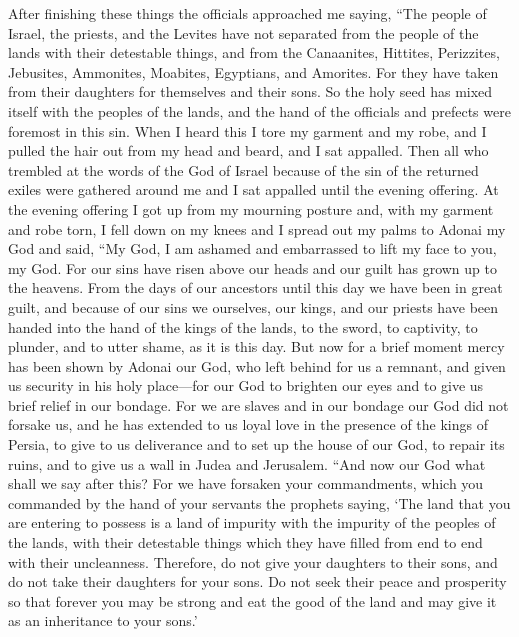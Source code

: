 \begin{biblechapter} %
 After finishing these things the officials approached me saying, “The people of Israel, the priests, and the Levites have not separated from the people of the lands with their detestable things, and from the Canaanites, Hittites, Perizzites, Jebusites, Ammonites, Moabites, Egyptians, and Amorites.
\verse For they have taken from their daughters for themselves and their sons. So the holy seed has mixed itself with the peoples of the lands, and the hand of the officials and prefects were foremost in this sin.
\verse When I heard this I tore my garment and my robe, and I pulled the hair out from my head and beard, and I sat appalled.
\verse Then all who trembled at the words of the God of Israel because of the sin of the returned exiles were gathered around me and I sat appalled until the evening offering.
 At the evening offering I got up from my mourning posture and, with my garment and robe torn, I fell down on my knees and I spread out my palms to Adonai my God
\verse and said, “My God, I am ashamed and embarrassed to lift my face to you, my God. For our sins have risen above our heads and our guilt has grown up to the heavens.
\verse From the days of our ancestors until this day we have been in great guilt, and because of our sins we ourselves, our kings, and our priests have been handed into the hand of the kings of the lands, to the sword, to captivity, to plunder, and to utter shame, as it is this day.
\verse But now for a brief moment mercy has been shown by Adonai our God, who left behind for us a remnant, and given us security in his holy place—for our God to brighten our eyes and to give us brief relief in our bondage.
\verse For we are slaves and in our bondage our God did not forsake us, and he has extended to us loyal love in the presence of the kings of Persia, to give to us deliverance and to set up the house of our God, to repair its ruins, and to give us a wall in Judea and Jerusalem.
\verse “And now our God what shall we say after this? For we have forsaken your commandments,
\verse which you commanded by the hand of your servants the prophets saying, ‘The land that you are entering to possess is a land of impurity with the impurity of the peoples of the lands, with their detestable things which they have filled from end to end with their uncleanness.
\verse Therefore, do not give your daughters to their sons, and do not take their daughters for your sons. Do not seek their peace and prosperity so that forever you may be strong and eat the good of the land and may give it as an inheritance to your sons.’

\end{biblechapter}
